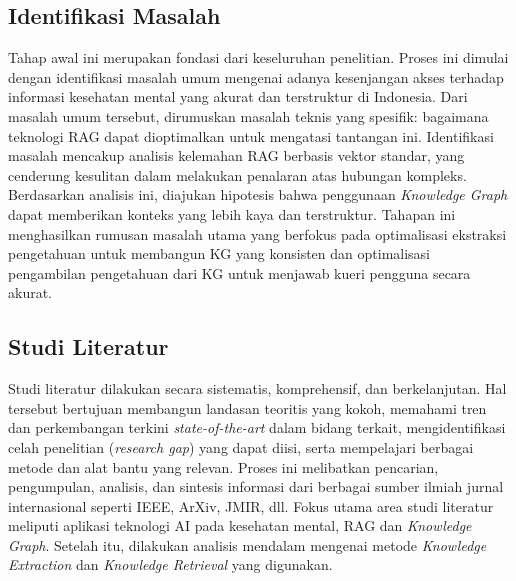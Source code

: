 \subsection{Identifikasi Masalah}
Tahap awal ini merupakan fondasi dari keseluruhan penelitian. Proses ini dimulai dengan identifikasi masalah umum mengenai adanya kesenjangan akses terhadap informasi kesehatan mental yang akurat dan terstruktur di Indonesia.
Dari masalah umum tersebut, dirumuskan masalah teknis yang spesifik: bagaimana teknologi RAG dapat dioptimalkan untuk mengatasi tantangan ini.
Identifikasi masalah mencakup analisis kelemahan RAG berbasis vektor standar, yang cenderung kesulitan dalam melakukan penalaran atas hubungan kompleks.
Berdasarkan analisis ini, diajukan hipotesis bahwa penggunaan \textit{Knowledge Graph} dapat memberikan konteks yang lebih kaya dan terstruktur.
Tahapan ini menghasilkan rumusan masalah utama yang berfokus pada optimalisasi ekstraksi pengetahuan untuk membangun KG yang konsisten dan optimalisasi pengambilan pengetahuan dari KG untuk menjawab kueri pengguna secara akurat.

\subsection{Studi Literatur}
Studi literatur dilakukan secara sistematis, komprehensif, dan berkelanjutan.
Hal tersebut bertujuan membangun landasan teoritis yang kokoh, memahami tren dan perkembangan terkini \textit{state-of-the-art} dalam bidang terkait, mengidentifikasi celah penelitian (\textit{research gap}) yang dapat diisi, serta mempelajari berbagai metode dan alat bantu yang relevan.
Proses ini melibatkan pencarian, pengumpulan, analisis, dan sintesis informasi dari berbagai sumber ilmiah jurnal internasional seperti IEEE, ArXiv, JMIR, dll.
Fokus utama area studi literatur meliputi aplikasi teknologi AI pada kesehatan mental, RAG dan \textit{Knowledge Graph}.
Setelah itu, dilakukan analisis mendalam mengenai metode \textit{Knowledge Extraction} dan \textit{Knowledge Retrieval} yang digunakan.


